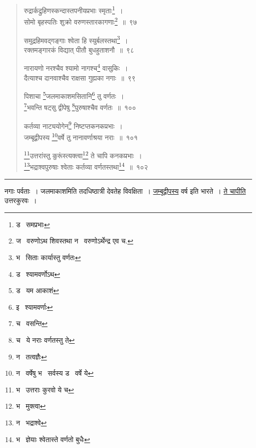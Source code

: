 \documentclass[11pt, openany]{book}
\begin{document}
\begin{quote}
{\na रुद्रार्कद्रुहिणस्कन्दास्तपनीयप्रभाः स्मृताः\renewcommand{\thefootnote}{1}\footnote{ड \textendash\ समप्रभाः}~।\\
सोमो बृहस्पतिः शुक्रो वरुणस्तारकागणाः\renewcommand{\thefootnote}{2}\footnote{ज \textendash\ वरुणोऽथ शिवस्तथा न \textendash\ वरुणोऽर्थेन्द्र एव च.}~॥~९७

समुद्रहिमवद्गङ्गाः श्वेता हि स्युर्बलस्तथा\renewcommand{\thefootnote}{3}\footnote{भ \textendash\ सिताः कार्यास्तु वर्णतः}~।\\
रक्तमङ्गारकं विद्यात् पीतौ बुधहुताशनौ~॥~९८

नारायणो नरश्चैव श्यामो नागश्च\renewcommand{\thefootnote}{4}\footnote{ड \textendash\ श्यामवर्णोऽथ} वासुकिः~।\\
दैत्याश्च दानवाश्चैव राक्षसा गुह्यका नगाः~॥~९९

पिशाचा \renewcommand{\thefootnote}{5}\footnote{ड \textendash\ यम आकाशं}जलमाकाशमसितानि\renewcommand{\thefootnote}{6}\footnote{इ \textendash\ श्यामवर्णाः} तु वर्णतः~।\\
\renewcommand{\thefootnote}{7}\footnote{च \textendash\ वसन्ति}भवन्ति षट्सु द्वीपेषु \renewcommand{\thefootnote}{8}\footnote{च \textendash\ ये नराः वर्णतस्तु ते}पुरुषाश्चैव वर्णतः~॥~१००

कर्तव्या नाट्ययोगेन\renewcommand{\thefootnote}{9}\footnote{न \textendash\ तत्वज्ञैः} निष्टप्तकनकप्रभाः~।\\
जम्बूद्वीपस्य \renewcommand{\thefootnote}{10}\footnote{न \textendash\ वर्षेषु भ \textendash\ सर्वस्य ड \textendash\ वर्षे ये}वर्षे तु नानावर्णाश्रया नराः~॥~१०१

\renewcommand{\thefootnote}{11}\footnote{भ \textendash\ उत्तराः कुरवो ये च}उत्तरांस्तु कुरूंस्त्यक्त्वा\renewcommand{\thefootnote}{12}\footnote{भ \textendash\ मुक्त्वा} ते चापि कनकप्रभाः~।\\
\renewcommand{\thefootnote}{13}\footnote{न \textendash\ भद्राश्वे}भद्राश्वपुरुषाः श्वेताः कर्तव्या वर्णतस्तथा\renewcommand{\thefootnote}{14}\footnote{भ \textendash\ ज्ञेयाः श्वेतास्ते वर्णतो बुधैः}~॥~१०२}
\end{quote}

\hrule

\vspace{2mm}
नगाः पर्वताः~। जलमाकाशमिति तदधिष्ठात्री देवतेह विवक्षिता~। \underline{जम्बूद्वीपस्य} वर्ष इति भारते~। \underline{ते चापीति} उत्तरकुरवः~। 

\newpage
\end{document}
